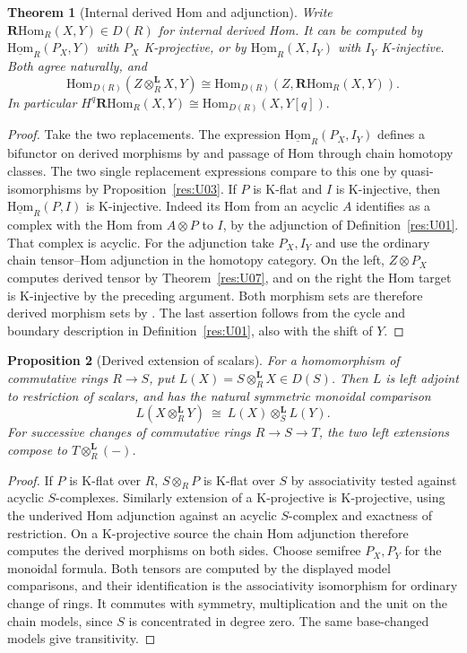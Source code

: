 \documentclass[11pt,oneside,openany]{book}
\newtheorem{theorem}{Theorem}[chapter]
\newtheorem{proposition}[theorem]{Proposition}
\theoremstyle{definition}
\theoremstyle{remark}
\begin{document}
\begin{theorem}[Internal derived Hom and adjunction]\label{res:U08}
Write \(\mathbf R\mathrm{Hom}_R(X,Y)\in D(R)\) for internal
derived Hom. It can be computed by
\(\underline{\mathrm{Hom}}_R(P_X,Y)\) with \(P_X\) K-projective,
or by \(\underline{\mathrm{Hom}}_R(X,I_Y)\) with \(I_Y\)
K-injective. Both agree naturally, and
\[
 \mathrm{Hom}_{D(R)}(Z\otimes_R^{\mathbf L}X,Y)
  \cong \mathrm{Hom}_{D(R)}(Z,\mathbf R\mathrm{Hom}_R(X,Y)).
\]
In particular
\(
 H^q\mathbf R\mathrm{Hom}_R(X,Y)
   \cong\mathrm{Hom}_{D(R)}(X,Y[q]).
\)
\end{theorem}
\begin{proof}
Take the two replacements. The expression
\(\underline{\mathrm{Hom}}_R(P_X,I_Y)\) defines a bifunctor
on derived morphisms by \cite[R04]{ha-core} and passage of Hom
through chain homotopy classes. The two single replacement
expressions compare to this one by quasi-isomorphisms by
Proposition~\ref{res:U03}. If \(P\) is K-flat and \(I\) is
K-injective, then \(\underline{\mathrm{Hom}}_R(P,I)\) is
K-injective. Indeed its Hom from an acyclic \(A\) identifies
as a complex with the Hom from \(A\otimes P\) to \(I\), by the
adjunction of Definition~\ref{res:U01}. That complex is acyclic.
For the adjunction take \(P_X,I_Y\) and use the ordinary
chain tensor--Hom adjunction in the homotopy category.
On the left, \(Z\otimes P_X\) computes derived tensor by
Theorem~\ref{res:U07}, and on the right the Hom target is
K-injective by the preceding argument. Both morphism sets
are therefore derived morphism sets by \cite[R04]{ha-core}.
The last assertion follows from the cycle and boundary description
in Definition~\ref{res:U01}, also with the shift of \(Y\).
\end{proof}

\begin{proposition}[Derived extension of scalars]\label{res:U09}
For a homomorphism of commutative rings \(R\to S\), put
\(L(X)=S\otimes_R^{\mathbf L}X\in D(S)\).
Then \(L\) is left adjoint to restriction of scalars, and has the
natural symmetric monoidal comparison
\[
 L(X\otimes_R^{\mathbf L}Y)\ \cong\
 L(X)\otimes_S^{\mathbf L} L(Y).
\]
For successive changes of commutative rings \(R\to S\to T\), the two left extensions
compose to \(T\otimes_R^{\mathbf L}(-)\).
\end{proposition}
\begin{proof}
If \(P\) is K-flat over \(R\), \(S\otimes_R P\) is K-flat over \(S\)
by associativity tested against acyclic \(S\)-complexes.
Similarly extension of a K-projective is K-projective, using the
underived Hom adjunction against an acyclic \(S\)-complex and
exactness of restriction. On a K-projective source the chain Hom
adjunction therefore computes the derived morphisms on both sides.
Choose semifree \(P_X,P_Y\) for the monoidal formula. Both tensors
are computed by the displayed model comparisons, and their
identification is the associativity isomorphism for ordinary
change of rings. It commutes with symmetry, multiplication and the
unit on the chain models, since \(S\) is concentrated in degree zero.
The same base-changed models give transitivity.
\end{proof}
\end{document}
